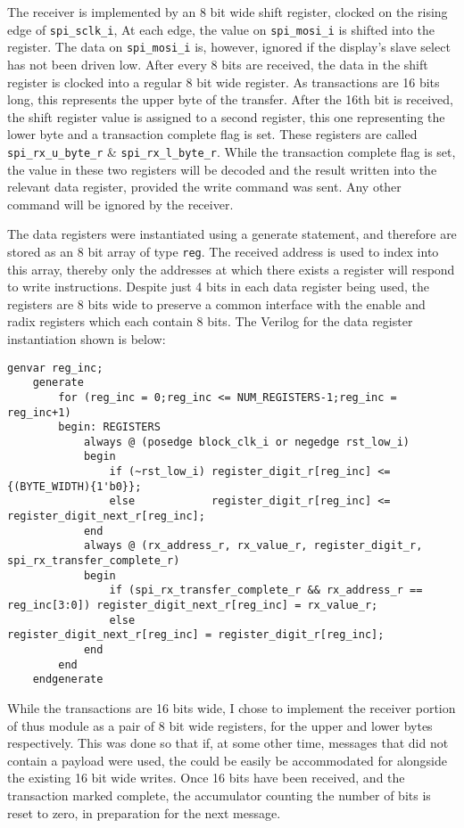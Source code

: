 \documentclass[11pt,british]{report}
\begin{document}
The receiver is implemented by an 8 bit wide shift register, clocked on the rising edge of \texttt{spi_sclk_i}, At each edge, the value on \texttt{spi_mosi_i} is shifted into the register. The data on \texttt{spi_mosi_i} is, however, ignored if the display's slave select has not been driven low. After every 8 bits are received, the data in the shift register is clocked into a regular 8 bit wide register. As transactions are 16 bits long, this represents the upper byte of the transfer. After the 16th bit is received, the shift register value is assigned to a second register, this one representing the lower byte and a transaction complete flag is set. These registers are called \texttt{spi_rx_u_byte_r} \& \texttt{spi_rx_l_byte_r}. While the transaction complete flag is set, the value in these two registers will be decoded and the result written into the relevant data register, provided the write command was sent. Any other command will be ignored by the receiver.

The data registers were instantiated using a generate statement, and therefore are stored as an 8 bit array of type \texttt{reg}. The received address is used to index into this array, thereby only the addresses at which there exists a register will respond to write instructions. Despite just 4 bits in each data register being used, the registers are 8 bits wide to preserve a common interface with the enable and radix registers which each contain 8 bits. The Verilog for the data register instantiation shown is below:
\begin{lstlisting}[style={verilog-style}]
    genvar reg_inc;
    generate
        for (reg_inc = 0;reg_inc <= NUM_REGISTERS-1;reg_inc = reg_inc+1)
        begin: REGISTERS
            always @ (posedge block_clk_i or negedge rst_low_i)
            begin
                if (~rst_low_i) register_digit_r[reg_inc] <= {(BYTE_WIDTH){1'b0}};
                else            register_digit_r[reg_inc] <= register_digit_next_r[reg_inc];
            end
            always @ (rx_address_r, rx_value_r, register_digit_r, spi_rx_transfer_complete_r)
            begin
                if (spi_rx_transfer_complete_r && rx_address_r == reg_inc[3:0]) register_digit_next_r[reg_inc] = rx_value_r;
                else                                                            register_digit_next_r[reg_inc] = register_digit_r[reg_inc];
            end
        end
    endgenerate
\end{lstlisting}

While the transactions are 16 bits wide, I chose to implement the receiver portion of thus module as a pair of 8 bit wide registers, for the upper and lower bytes respectively. This was done so that if, at some other time, messages that did not contain a payload were used, the could be easily be accommodated for alongside the existing 16 bit wide writes. Once 16 bits have been received, and the transaction marked complete, the accumulator counting the number of bits is reset to zero, in preparation for the next message.
\end{document}
